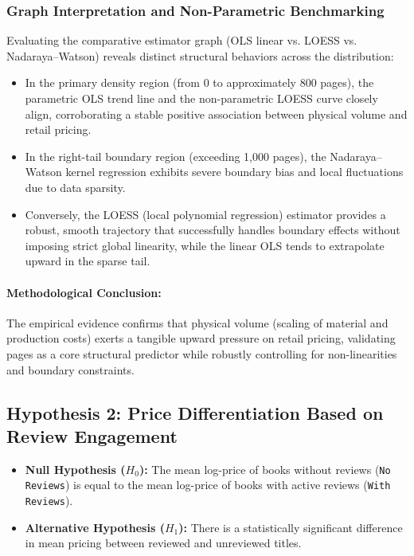 \documentclass[11pt,a4paper]{article}
\begin{document}
\subsubsection*{Graph Interpretation and Non-Parametric Benchmarking}
Evaluating the comparative estimator graph (OLS linear vs. LOESS vs. Nadaraya--Watson) reveals distinct structural behaviors across the distribution:
\begin{itemize}
    \item In the primary density region (from 0 to approximately 800 pages), the parametric OLS trend line and the non-parametric LOESS curve closely align, corroborating a stable positive association between physical volume and retail pricing.
    \item In the right-tail boundary region (exceeding 1,000 pages), the Nadaraya--Watson kernel regression exhibits severe boundary bias and local fluctuations due to data sparsity.
    \item Conversely, the LOESS (local polynomial regression) estimator provides a robust, smooth trajectory that successfully handles boundary effects without imposing strict global linearity, while the linear OLS tends to extrapolate upward in the sparse tail.
\end{itemize}

\paragraph{Methodological Conclusion:} The empirical evidence confirms that physical volume (scaling of material and production costs) exerts a tangible upward pressure on retail pricing, validating pages as a core structural predictor while robustly controlling for non-linearities and boundary constraints.

\subsection{Hypothesis 2: Price Differentiation Based on Review Engagement}

\begin{itemize}
    \item \textbf{Null Hypothesis ($H_0$):} The mean log-price of books without reviews (\texttt{No Reviews}) is equal to the mean log-price of books with active reviews (\texttt{With Reviews}).
    \item \textbf{Alternative Hypothesis ($H_1$):} There is a statistically significant difference in mean pricing between reviewed and unreviewed titles.
\end{itemize}
\end{document}
